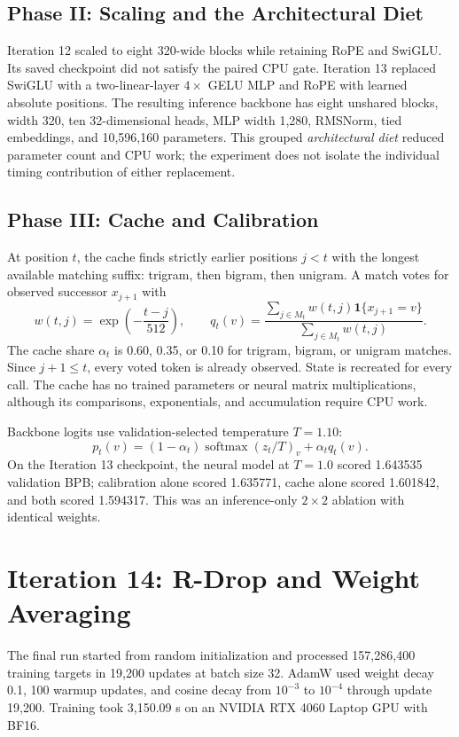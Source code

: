 \documentclass[10pt,a4paper]{article}
\begin{document}
\subsection{Phase II: Scaling and the Architectural Diet}
Iteration 12 scaled to eight 320-wide blocks while retaining RoPE and SwiGLU. Its saved checkpoint did not satisfy the paired CPU gate. Iteration 13 replaced SwiGLU with a two-linear-layer $4\times$ GELU MLP and RoPE with learned absolute positions. The resulting inference backbone has eight unshared blocks, width 320, ten 32-dimensional heads, MLP width 1,280, RMSNorm, tied embeddings, and 10,596,160 parameters. This grouped \emph{architectural diet} reduced parameter count and CPU work; the experiment does not isolate the individual timing contribution of either replacement.

\subsection{Phase III: Cache and Calibration}
At position $t$, the cache finds strictly earlier positions $j<t$ with the longest available matching suffix: trigram, then bigram, then unigram. A match votes for observed successor $x_{j+1}$ with
\begin{equation}
w(t,j)=\exp\!\left(-\frac{t-j}{512}\right),\qquad
q_t(v)=\frac{\sum_{j\in M_t}w(t,j)\mathbf{1}\{x_{j+1}=v\}}
{\sum_{j\in M_t}w(t,j)}.
\end{equation}
The cache share $\alpha_t$ is 0.60, 0.35, or 0.10 for trigram, bigram, or unigram matches. Since $j+1\leq t$, every voted token is already observed. State is recreated for every call. The cache has no trained parameters or neural matrix multiplications, although its comparisons, exponentials, and accumulation require CPU work.

Backbone logits use validation-selected temperature $T=1.10$:
\begin{equation}\label{eq:mix}
p_t(v)=(1-\alpha_t)\operatorname{softmax}(z_t/T)_v+\alpha_tq_t(v).
\end{equation}
On the Iteration 13 checkpoint, the neural model at $T=1.0$ scored 1.643535 validation BPB; calibration alone scored 1.635771, cache alone scored 1.601842, and both scored 1.594317. This was an inference-only $2\times2$ ablation with identical weights.

\section{Iteration 14: R-Drop and Weight Averaging}
The final run started from random initialization and processed 157,286,400 training targets in 19,200 updates at batch size 32. AdamW used weight decay 0.1, 100 warmup updates, and cosine decay from $10^{-3}$ to $10^{-4}$ through update 19,200. Training took 3,150.09 s on an NVIDIA RTX 4060 Laptop GPU with BF16.
\end{document}
